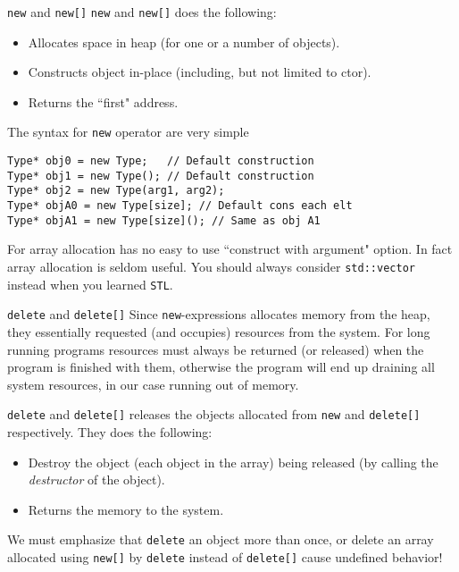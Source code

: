 \begin{frame}[fragile]{\texttt{new} and \texttt{new[]}}
\texttt{new} and \texttt{new[]} does the following:
\begin{itemize}
\item Allocates space in heap (for one or a number of objects). 
\item Constructs object in-place (including, but not limited to ctor). 
\item Returns the ``first" address.
\end{itemize}
The syntax for \texttt{new} operator are very simple 
\begin{verbatim}
Type* obj0 = new Type;   // Default construction
Type* obj1 = new Type(); // Default construction
Type* obj2 = new Type(arg1, arg2); 
Type* objA0 = new Type[size]; // Default cons each elt
Type* objA1 = new Type[size](); // Same as obj A1
\end{verbatim}
For array allocation has no easy to use ``construct with argument" option. In fact array allocation is seldom useful. You should always consider \texttt{std::vector} instead when you learned \texttt{STL}.
\end{frame}

\begin{frame}[fragile]{\texttt{delete} and \texttt{delete[]}}
Since \texttt{new}-expressions allocates memory from the heap, they essentially requested (and occupies) resources from the system. For long running programs resources must always be returned (or released) when the program is finished with them, otherwise the program will end up draining all system resources, in our case running out of memory. 

\texttt{delete} and \texttt{delete[]} releases the objects allocated from \texttt{new} and \texttt{delete[]} \alert{respectively}. They does the following:
\begin{itemize}
\item Destroy the object (each object in the array) being released (by calling the \textit{destructor} of the object).
\item Returns the memory to the system.
\end{itemize}
We must emphasize that \alert{\texttt{delete} an object more than once, or delete an array allocated using \texttt{new[]} by \texttt{delete} instead of \texttt{delete[]} cause undefined behavior!}
\end{frame}

